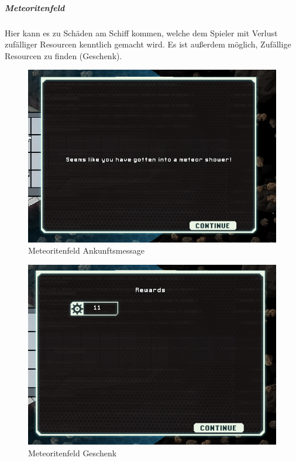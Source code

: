 \documentclass[fontsize=12pt,paper=a4,twoside]{scrartcl}
\begin{document}
\subparagraph{Meteoritenfeld} Hier kann es zu Schäden am Schiff kommen, welche dem Spieler mit Verlust zufälliger Resourcen kenntlich gemacht wird. Es ist außerdem möglich, Zufällige Resourcen zu finden (Geschenk).

\begin{figure}[H]
\centering
\includegraphics[width=1\linewidth]{DasSpiel/Karte/meteor.png}
\caption{Meteoritenfeld Ankunftsmessage}
\end{figure} 

\begin{figure}[H]
\centering
\includegraphics[width=1\linewidth]{DasSpiel/Karte/meteorPresent.png}
\caption{Meteoritenfeld Geschenk}
\end{figure} 
\end{document}
